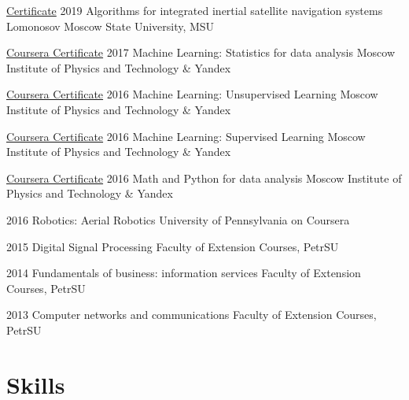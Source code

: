 \documentclass{tccv}
\begin{document}
\begin{yearlist}

\item[\href{https://www.dropbox.com/s/116ku7br2kqn5nr/doc00422820191224182244.pdf}{Certificate}]{2019}
     {Algorithms for integrated inertial satellite navigation systems}
     {Lomonosov Moscow State University, MSU}

\item[\href{https://www.coursera.org/account/accomplishments/records/PJCQYC92YUSU}{Coursera Certificate}]{2017}
     {Machine Learning: Statistics for data analysis}
     {Moscow Institute of Physics and Technology \& Yandex}

\item[\href{https://www.coursera.org/account/accomplishments/records/2MZW385H2Y2U}{Coursera Certificate}]{2016}
     {Machine Learning: Unsupervised Learning}
     {Moscow Institute of Physics and Technology \& Yandex}
     
\item[\href{https://www.coursera.org/account/accomplishments/records/UFDJLATYB83T}{Coursera Certificate}]{2016}
     {Machine Learning: Supervised Learning}
     {Moscow Institute of Physics and Technology \& Yandex}
     
\end{yearlist}
\begin{yearlist}

\item[\href{https://www.coursera.org/account/accomplishments/records/PJCQYC92YUSU}{Coursera Certificate}]{2016}
     {Math and Python for data analysis}
     {Moscow Institute of Physics and Technology \& Yandex}

\item[]{2016}
     {Robotics: Aerial Robotics}
     {University of Pennsylvania on Coursera}

\item[]{2015}
     {Digital Signal Processing}
     {Faculty of Extension Courses, PetrSU}

\item[]{2014}
     {Fundamentals of business: information services}
     {Faculty of Extension Courses, PetrSU}

\item[]{2013}
     {Computer networks and communications}
     {Faculty of Extension Courses, PetrSU}

\end{yearlist}

\newpage
\section{Skills}
\end{document}

